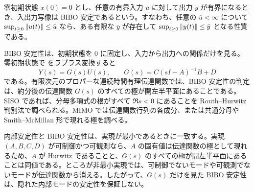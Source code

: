 \begin{definition}
零初期状態 $x(0)=0$ とし、任意の有界入力 $u$ に対して出力 $y$ が有界になるとき、入出力写像は BIBO 安定であるという。すなわち、任意の $\bar{u}<\infty$ について $\sup_{t\ge0}\left\|u(t)\right\|\le\bar{u}$ なら、ある有限な $\bar{y}$ が存在して $\sup_{t\ge0}\left\|y(t)\right\|\le\bar{y}$ となる性質である。
\end{definition}

BIBO 安定性は、初期状態を 0 に固定し、入力から出力への関係だけを見る。零初期状態で  をラプラス変換すると
\begin{equation}
  Y(s)=G(s)U(s),\qquad
  G(s)=C(sI-A)^{-1}B+D
  \label{eq:bibo-transfer}
\end{equation}
である。有限次元のプロパーな連続時間有理伝達関数では、BIBO 安定性の判定は、約分後の伝達関数 $G(s)$ のすべての極が開左半平面にあることである。SISO であれば、分母多項式の根がすべて $\Re s<0$ にあることを Routh--Hurwitz 判別法で調べられる。MIMO では伝達関数行列の各成分、または共通分母や Smith--McMillan 形で現れる極を調べる。

内部安定性と BIBO 安定性は、実現が最小であるときに一致する。実現 $(A,B,C,D)$ が可制御かつ可観測なら、$A$ の固有値は伝達関数の極として現れるため、$A$ が Hurwitz であることと、$G(s)$ のすべての極が開左半平面にあることは同値である。ところが非最小実現では、可制御でないモードや可観測でないモードが伝達関数から消える。したがって、$G(s)$ だけを見た BIBO 安定性は、隠れた内部モードの安定性を保証しない。

